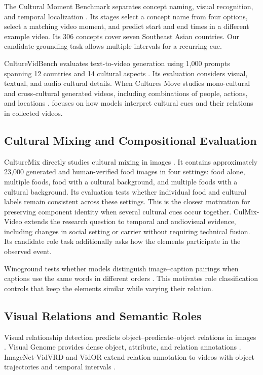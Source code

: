 The Cultural Moment Benchmark separates concept naming, visual recognition, and temporal localization \citep{satar-etal-2026-cultural}.
Its stages select a concept name from four options, select a matching video moment, and predict start and end times in a different example video.
Its 306 concepts cover seven Southeast Asian countries.
Our candidate grounding task allows multiple intervals for a recurring cue.

CultureVidBench evaluates text-to-video generation using 1,000 prompts spanning 12 countries and 14 cultural aspects \citep{han-etal-2026-culturevidbench}.
Its evaluation considers visual, textual, and audio cultural details.
When Cultures Move studies mono-cultural and cross-cultural generated videos, including combinations of people, actions, and locations \citep{li-etal-2026-cultures}.
\benchmark{} focuses on how models interpret cultural cues and their relations in collected videos.

\subsection{Cultural Mixing and Compositional Evaluation}
CultureMix directly studies cultural mixing in images \citep{Kim_2026_CVPR}.
It contains approximately 23,000 generated and human-verified food images in four settings: food alone, multiple foods, food with a cultural background, and multiple foods with a cultural background.
Its evaluation tests whether individual food and cultural labels remain consistent across these settings.
This is the closest motivation for preserving component identity when several cultural cues occur together.
CulMix-Video extends the research question to temporal and audiovisual evidence, including changes in social setting or carrier without requiring technical fusion.
Its candidate role task additionally asks how the elements participate in the observed event.

Winoground tests whether models distinguish image--caption pairings when captions use the same words in different orders \citep{thrush_and_ross2022winoground}.
This motivates role classification controls that keep the elements similar while varying their relation.

\subsection{Visual Relations and Semantic Roles}
Visual relationship detection predicts object--predicate--object relations in images \citep{lu2016visual}.
Visual Genome provides dense object, attribute, and relation annotations \citep{krishna2017visualgenome}.
ImageNet-VidVRD and VidOR extend relation annotation to videos with object trajectories and temporal intervals \citep{shang2017video,shang2019annotating}.

